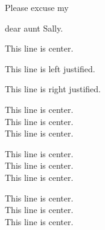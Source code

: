 \documentclass[11pt]{article}
\begin{document}
Please excuse my \begin{tiny}dear aunt Sally.\end{tiny}

\vspace{1cm}

\begin{center}This line is center.\end{center}

\begin{flushleft}This line is left justified.\end{flushleft}

\begin{flushright}This line is right justified.\end{flushright}


\centering
This line is center.\\
This line is center.\\
This line is center.

\Large
This line is center.\\
This line is center.\\
This line is center.


\tiny
This line is center.\\
This line is center.\\
This line is center.
\end{document}
